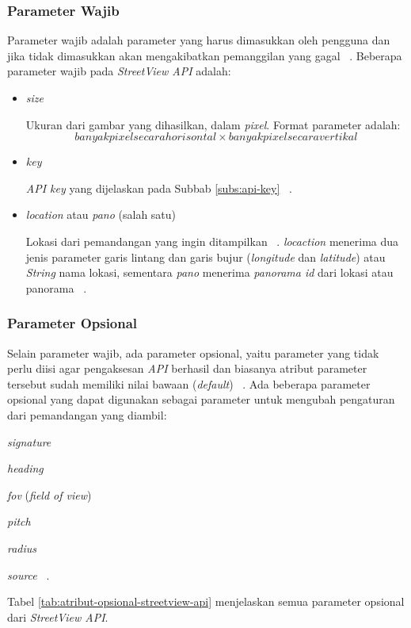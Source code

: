 \subsubsection{Parameter Wajib}
Parameter wajib adalah parameter yang harus dimasukkan oleh pengguna dan jika tidak dimasukkan akan mengakibatkan pemanggilan yang gagal ~\cite{streetview-api}. 
Beberapa parameter wajib pada {\it StreetView API} adalah:
\begin{itemize}
	\item \textit{size}
		
	Ukuran dari gambar yang dihasilkan, dalam \textit{pixel}. Format parameter adalah:
	$$ banyak \textit{pixel} secara horisontal \times banyak \textit{pixel} secara vertikal $$
	\item \textit{key}
	
	\textit{API key} yang dijelaskan pada Subbab \ref{subs:api-key} ~\cite{streetview-api}.
	\item \textit{location} atau \textit{pano} (salah satu)
	 
	 Lokasi dari pemandangan yang ingin ditampilkan ~\cite{streetview-api}. \textit{locaction} menerima dua jenis parameter garis lintang dan garis bujur (\textit{longitude} dan \textit{latitude}) atau \textit{String} nama lokasi, sementara \textit{pano} menerima \textit{panorama id} dari lokasi atau panorama ~\cite{streetview-api}. 
	 
\end{itemize}   

\subsubsection{Parameter Opsional}
Selain parameter wajib, ada parameter opsional, yaitu parameter yang tidak perlu diisi agar pengaksesan {\it API} berhasil dan biasanya atribut parameter tersebut sudah memiliki nilai bawaan ({\it default}) ~\cite{streetview-api}. Ada beberapa parameter opsional yang dapat digunakan sebagai parameter untuk mengubah pengaturan dari pemandangan yang diambil:
\begin{itemize}
	\item {\it signature
	\item {\it heading} }
	\item {\it fov} ({\it field of view}) 
	\item {\it pitch} 
	\item {\it radius} 
	\item {\it source} ~\cite{streetview-api}.
\end{itemize}
Tabel \ref{tab:atribut-opsional-streetview-api} menjelaskan semua parameter opsional dari \textit{StreetView API}.


